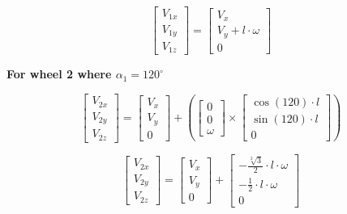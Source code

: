 \documentclass[answers]{exam}
\begin{document}
\begin{questions}
\begin{solution}
        \begin{equation} \label{eq:1}
            \begin{bmatrix}
                V_{1x} \\
                V_{1y} \\
                V_{1z}
            \end{bmatrix}
            = \begin{bmatrix}
                V_x                  \\
                V_y + l \cdot \omega \\
                0
            \end{bmatrix}
        \end{equation}

        \textbf{For wheel 2 where $\alpha_1 = 120^\circ$}

        \begin{equation*}
            \begin{bmatrix}
                V_{2x} \\
                V_{2y} \\
                V_{2z}
            \end{bmatrix}
            = \begin{bmatrix}
                V_x \\
                V_y \\
                0
            \end{bmatrix}
            + \left(\begin{bmatrix}
                0 \\
                0 \\
                \omega
            \end{bmatrix} \times \begin{bmatrix}
                \cos(120) \cdot l \\
                \sin(120) \cdot l \\
                0
            \end{bmatrix}\right)
        \end{equation*}

        \begin{equation*}
            \begin{bmatrix}
                V_{2x} \\
                V_{2y} \\
                V_{2z}
            \end{bmatrix}
            = \begin{bmatrix}
                V_x \\
                V_y \\
                0
            \end{bmatrix}
            + \begin{bmatrix}
                - \frac{\sqrt[2]{3}}{2} \cdot l \cdot \omega \\
                - \frac{1}{2} \cdot l \cdot \omega           \\
                0
            \end{bmatrix}
        \end{equation*}


\end{solution}
\end{questions}
\end{document}
